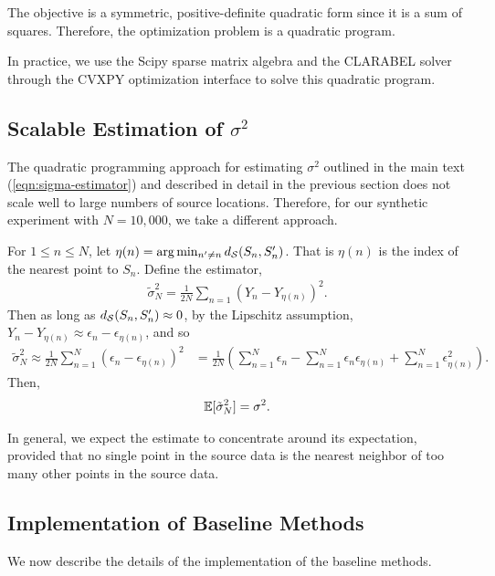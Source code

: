 The objective is a symmetric, positive-definite quadratic form since it is a sum of squares. Therefore, the optimization problem is a quadratic program.

In practice, we use the Scipy sparse matrix algebra \citep{2020SciPy-NMeth} and the CLARABEL solver \citep{Clarabel_2024} through the CVXPY optimization interface \citep{diamond2016cvxpy,agrawal2018rewriting} to solve this quadratic program. 

\subsection{Scalable Estimation of $\sigma^2$}\label{sec:scalable-estimation-of-noise-variance}
The quadratic programming approach for estimating $\sigma^2$ outlined in the main text (\cref{eqn:sigma-estimator}) and described in detail in the previous section does not scale well to large numbers of source locations. Therefore, for our synthetic experiment with $N=10{,}000$, we take a different approach. 

For $1 \leq n \leq N$, let $\eta(n) = \arg\min_{n' \neq n} d_{\mathcal{S}}(S_n,S_n')$. That is $\eta(n)$ is the index of the nearest point to $S_n$. Define the estimator,
\begin{align}
    \tilde{\sigma}^2_N = \frac{1}{2N}\sum_{n=1}(Y_n - Y_{\eta(n)})^2.
\end{align}
Then as long as $d_{\mathcal{S}}(S_n,S_n') \approx 0$, by the Lipschitz assumption, $Y_n - Y_{\eta(n)} \approx \epsilon_n - \epsilon_{\eta(n)}$, and so 
\begin{align}
    \tilde{\sigma}^2_N \approx \frac{1}{2N}\sum_{n=1}^N(\epsilon_n - \epsilon_{\eta(n)})^2 & = \frac{1}{2N}\left(\sum_{n=1}^N\epsilon_n - \sum_{n=1}^N\epsilon_n\epsilon_{\eta(n)} + \sum_{n=1}^N\epsilon_{\eta(n)}^2\right).
\end{align}
Then,
\begin{align}
    \mathbb{E}[\tilde{\sigma}^2_N ] = \sigma^2.
\end{align}

In general, we expect the estimate to concentrate around its expectation, provided that no single point in the source data is the nearest neighbor of too many other points in the source data.

\subsection{Implementation of Baseline Methods}\label{sec:implementation-of-baselines}
We now describe the details of the implementation of the baseline methods.

